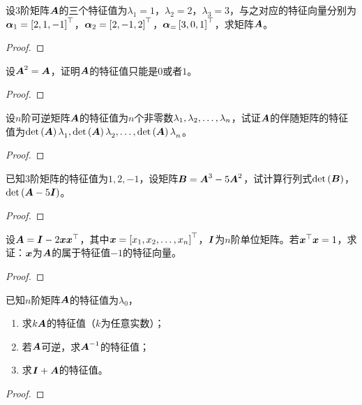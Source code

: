 \begin{problem}
设\(3\)阶矩阵\(\boldsymbol{A}\)的三个特征值为\(\lambda_1=1\)，\(\lambda_2=2\)，\(\lambda_3=3\)，与之对应的特征向量分别为\(\boldsymbol{\alpha}_1=\left[ 2,1,-1 \right]^\top\)，\(\boldsymbol{\alpha}_2=\left[ 2,-1,2 \right]^\top\)，\(\boldsymbol{\alpha}_=\left[ 3,0,1 \right]^\top\)，求矩阵\(\boldsymbol{A}\)。
\end{problem}
\begin{proof}

\end{proof}

\begin{problem}
设\(\boldsymbol{A}^2=\boldsymbol{A}\)，证明\(\boldsymbol{A}\)的特征值只能是\(0\)或者\(1\)。
\end{problem}
\begin{proof}

\end{proof}

\begin{problem}
设\(n\)阶可逆矩阵\(\boldsymbol{A}\)的特征值为\(n\)个非零数\({\lambda}_1,{\lambda}_2,\dots,{\lambda}_{n}\)，试证\(\boldsymbol{A}\)的伴随矩阵的特征值为\({\mathrm{det}\left( \boldsymbol{A} \right)\lambda}_1,{\mathrm{det}\left( \boldsymbol{A} \right)\lambda}_2,\dots,{\mathrm{det}\left( \boldsymbol{A} \right)\lambda}_{n}\)。
\end{problem}
\begin{proof}

\end{proof}

\begin{problem}
已知\(3\)阶矩阵的特征值为\(1,2,-1\)，设矩阵\(\boldsymbol{B}=\boldsymbol{A}^3-5\boldsymbol{A}^2\)，试计算行列式\(\mathrm{det}\left( \boldsymbol{B} \right)\)，\(\mathrm{det}\left( \boldsymbol{A}-5\boldsymbol{I} \right)\)。
\end{problem}
\begin{proof}

\end{proof}

\begin{problem}
设\(\boldsymbol{A}=\boldsymbol{I}-2\boldsymbol{x}\boldsymbol{x}^\top\)，其中\(\boldsymbol{x}=\left[ {x}_1,{x}_2,\dots,{x}_{n} \right]^\top\)，\(\boldsymbol{I}\)为\(n\)阶单位矩阵。若\(\boldsymbol{x}^\top\boldsymbol{x}=1\)，求证：\(\boldsymbol{x}\)为\(\boldsymbol{A}\)的属于特征值\(-1\)的特征向量。
\end{problem}
\begin{proof}

\end{proof}

\begin{problem}
已知\(n\)阶矩阵\(\boldsymbol{A}\)的特征值为\(\lambda_0\)，
\begin{enumerate}
    \item 求\(k\boldsymbol{A}\)的特征值（\(k\)为任意实数）；
    \item 若\(\boldsymbol{A}\)可逆，求\({\boldsymbol{A}}^{-1}\)的特征值；
    \item 求\(\boldsymbol{I}+\boldsymbol{A}\)的特征值。
\end{enumerate}
\end{problem}
\begin{proof}

\end{proof}

